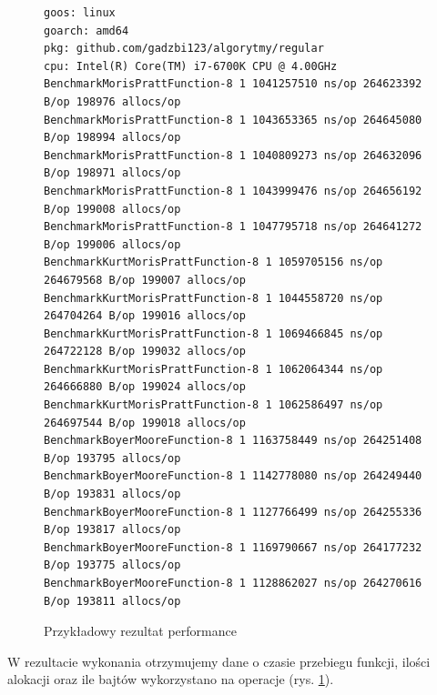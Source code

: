 \begin{figure}[h]
  \centering
  \begin{lstlisting}
goos: linux
goarch: amd64
pkg: github.com/gadzbi123/algorytmy/regular
cpu: Intel(R) Core(TM) i7-6700K CPU @ 4.00GHz
BenchmarkMorisPrattFunction-8 1	1041257510 ns/op 264623392 B/op 198976 allocs/op
BenchmarkMorisPrattFunction-8 1	1043653365 ns/op 264645080 B/op 198994 allocs/op
BenchmarkMorisPrattFunction-8 1	1040809273 ns/op 264632096 B/op 198971 allocs/op
BenchmarkMorisPrattFunction-8 1	1043999476 ns/op 264656192 B/op 199008 allocs/op
BenchmarkMorisPrattFunction-8 1	1047795718 ns/op 264641272 B/op 199006 allocs/op
BenchmarkKurtMorisPrattFunction-8 1	1059705156 ns/op 264679568 B/op 199007 allocs/op
BenchmarkKurtMorisPrattFunction-8 1	1044558720 ns/op 264704264 B/op 199016 allocs/op
BenchmarkKurtMorisPrattFunction-8 1	1069466845 ns/op 264722128 B/op 199032 allocs/op
BenchmarkKurtMorisPrattFunction-8 1	1062064344 ns/op 264666880 B/op 199024 allocs/op
BenchmarkKurtMorisPrattFunction-8 1	1062586497 ns/op 264697544 B/op 199018 allocs/op
BenchmarkBoyerMooreFunction-8 1	1163758449 ns/op 264251408 B/op 193795 allocs/op
BenchmarkBoyerMooreFunction-8 1	1142778080 ns/op 264249440 B/op 193831 allocs/op
BenchmarkBoyerMooreFunction-8 1	1127766499 ns/op 264255336 B/op 193817 allocs/op
BenchmarkBoyerMooreFunction-8 1	1169790667 ns/op 264177232 B/op 193775 allocs/op
BenchmarkBoyerMooreFunction-8 1	1128862027 ns/op 264270616 B/op 193811 allocs/op
  \end{lstlisting}
  \caption{Przykładowy rezultat performance}
  \label{fig:perfTestResults}
\end{figure}

W rezultacie wykonania otrzymujemy dane o czasie przebiegu funkcji, ilości 
alokacji oraz ile bajtów wykorzystano na operacje (rys. \ref{fig:perfTestResults}).

